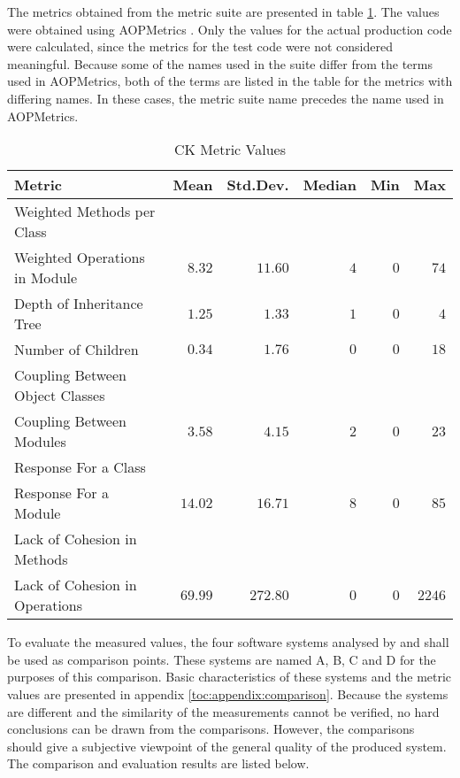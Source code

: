 The metrics obtained from the  metric suite are presented 
in table \ref{table:evaluation:ck}. The values were obtained using 
AOPMetrics \citep{aopmetrics}. Only the values for the actual 
production code were calculated, since the metrics for the test code 
were not considered meaningful. Because some of the names used in the 
 suite differ from the terms used in AOPMetrics, both of 
the terms are listed in the table for the metrics with differing 
names. In these cases, the  metric suite name precedes the 
name used in AOPMetrics.

\begin{center}
\begin{longtable}[h]{|l|r|r|r|r|r|}
\caption[CK Metric Values]{CK Metric Values} \label{table:evaluation:ck}\\
\hline \textbf{Metric} & \textbf{Mean} & \textbf{Std.Dev.} & 
\textbf{Median} & \textbf{Min} & \textbf{Max}\\
\hline 
\endfirsthead
\endhead
Weighted Methods per Class & & & & &\\
Weighted Operations in Module & $8.32$ & $11.60$ & $4$ & $0$ & $74$\\
\hline
Depth of Inheritance Tree & $1.25$ & $1.33$ & $1$ & $0$ & $4$\\
\hline
Number of Children & $0.34$ & $1.76$ & $0$ & $0$ & $18$\\
\hline
Coupling Between Object Classes & & & & &\\
Coupling Between Modules & $3.58$ & $4.15$ & $2$ & $0$ & $23$\\
\hline
Response For a Class & & & & &\\
Response For a Module & $14.02$ & $16.71$ & $8$ & $0$ & $85$\\
\hline
Lack of Cohesion in Methods & & & & &\\
Lack of Cohesion in Operations & $69.99$ & $272.80$ & $0$ & $0$ & $2246$\\
\hline
\end{longtable}
\end{center}

To evaluate the measured values, the four software systems analysed by 
\citep{oodmetrics} and \citep{ckanalysis} shall be used as comparison 
points. These systems are named A, B, C and D for the purposes of this 
comparison. Basic characteristics of these systems and the metric 
values are presented in appendix \ref{toc:appendix:comparison}. 
Because the systems are different and the similarity of the 
measurements cannot be verified, no hard conclusions can be drawn from 
the comparisons. However, the comparisons should give a subjective 
viewpoint of the general quality of the produced system. The 
comparison and evaluation results are listed below.

